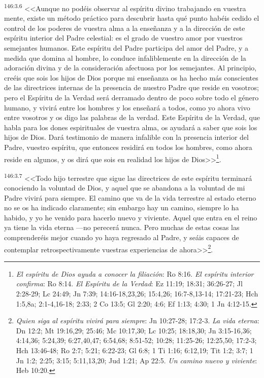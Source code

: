 \par 
\textsuperscript{146:3.6} <<Aunque no podéis observar al espíritu divino trabajando en vuestra mente, existe un método práctico para descubrir hasta qué punto habéis cedido el control de los poderes de vuestra alma a la enseñanza y a la dirección de este espíritu interior del Padre celestial: es el grado de vuestro amor por vuestros semejantes humanos. Este espíritu del Padre participa del amor del Padre, y a medida que domina al hombre, lo conduce infaliblemente en la dirección de la adoración divina y de la consideración afectuosa por los semejantes. Al principio, creéis que sois los hijos de Dios porque mi enseñanza os ha hecho más conscientes de las directrices internas de la presencia de nuestro Padre que reside en vosotros; pero el Espíritu de la Verdad será derramado dentro de poco sobre todo el género humano, y vivirá entre los hombres y los enseñará a todos, como yo ahora vivo entre vosotros y os digo las palabras de la verdad. Este Espíritu de la Verdad, que habla para los dones espirituales de vuestra alma, os ayudará a saber que sois los hijos de Dios. Dará testimonio de manera infalible con la presencia interior del Padre, vuestro espíritu, que entonces residirá en todos los hombres, como ahora reside en algunos, y os dirá que sois en realidad los hijos de Dios>>\footnote{\textit{El espíritu de Dios ayuda a conocer la filiación}: Ro 8:16. \textit{El espíritu interior confirma}: Ro 8:14. \textit{El Espíritu de la Verdad}: Ez 11:19; 18:31; 36:26-27; Jl 2:28-29; Lc 24:49; Jn 7:39; 14:16-18,23,26; 15:4,26; 16:7-8,13-14; 17:21-23; Hch 1:5,8a; 2:1-4,16-18; 2:33; 2 Co 13:5; Gl 2:20; 4:6; Ef 1:13; 4:30; 1 Jn 4:12-15.}.

\par 
\textsuperscript{146:3.7} <<Todo hijo terrestre que sigue las directrices de este espíritu terminará conociendo la voluntad de Dios, y aquel que se abandona a la voluntad de mi Padre vivirá para siempre. El camino que va de la vida terrestre al estado eterno no se os ha indicado claramente; sin embargo hay un camino, siempre lo ha habido, y yo he venido para hacerlo nuevo y viviente. Aquel que entra en el reino ya tiene la vida eterna ---no perecerá nunca. Pero muchas de estas cosas las comprenderéis mejor cuando yo haya regresado al Padre, y seáis capaces de contemplar retrospectivamente vuestras experiencias de ahora>>\footnote{\textit{Quien siga al espíritu vivirá para siempre}: Jn 10:27-28; 17:2-3. \textit{La vida eterna}: Dn 12:2; Mt 19:16,29; 25:46; Mc 10:17,30; Lc 10:25; 18:18,30; Jn 3:15-16,36; 4:14,36; 5:24,39; 6:27,40,47; 6:54,68; 8:51-52; 10:28; 11:25-26; 12:25,50; 17:2-3; Hch 13:46-48; Ro 2:7; 5:21; 6:22-23; Gl 6:8; 1 Ti 1:16; 6:12,19; Tit 1:2; 3:7; 1 Jn 1:2; 2:25; 3:15; 5:11,13,20; Jud 1:21; Ap 22:5. \textit{Un camino nuevo y viviente}: Heb 10:20.}.

